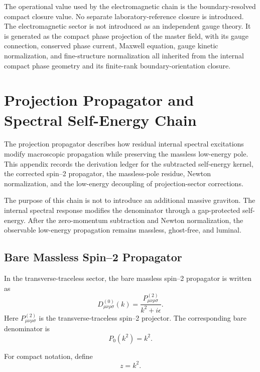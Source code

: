 \documentclass[11pt]{article}
\begin{document}
The operational value used by the electromagnetic chain is the
boundary-resolved compact closure value.  No separate laboratory-reference
closure is introduced.  The electromagnetic sector is not introduced as an
independent gauge theory.  It is generated as the compact phase projection of
the master field, with its gauge connection, conserved phase current, Maxwell
equation, gauge kinetic normalization, and fine-structure normalization all
inherited from the internal compact phase geometry and its finite-rank
boundary-orientation closure.

\section{Projection Propagator and Spectral Self-Energy Chain}
\label{sec:projection_propagator_chain}

The projection propagator describes how residual internal spectral excitations
modify macroscopic propagation while preserving the massless low-energy pole.
This appendix records the derivation ledger for the subtracted self-energy
kernel, the corrected spin--2 propagator, the massless-pole residue, Newton
normalization, and the low-energy decoupling of projection-sector corrections.

The purpose of this chain is not to introduce an additional massive graviton.
The internal spectral response modifies the denominator through a gap-protected
self-energy. After the zero-momentum subtraction and Newton normalization, the
observable low-energy propagation remains massless, ghost-free, and luminal.

\subsection{Bare Massless Spin--2 Propagator}

In the transverse-traceless sector, the bare massless spin--2 propagator is
written as
\begin{equation}
\boxed{
D_{\mu\nu\rho\sigma}^{(0)}(k)
=
\frac{
P_{\mu\nu\rho\sigma}^{(2)}
}{
k^2+i\epsilon
}.
}
\end{equation}
Here \(P_{\mu\nu\rho\sigma}^{(2)}\) is the transverse-traceless spin--2
projector. The corresponding bare denominator is
\begin{equation}
\boxed{
P_0(k^2)=k^2.
}
\end{equation}

For compact notation, define
\begin{equation}
\boxed{
z=k^2.
}
\end{equation}
\end{document}
